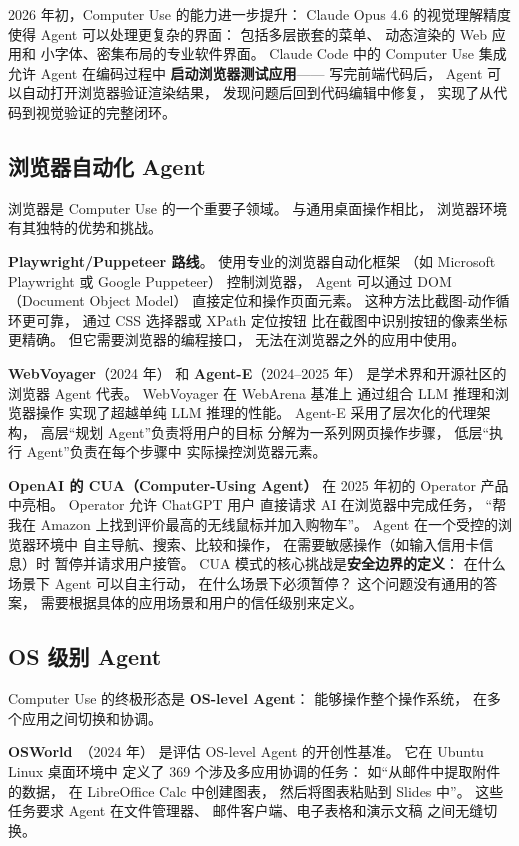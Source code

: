 2026 年初，Computer Use 的能力进一步提升：
Claude Opus 4.6 的视觉理解精度
使得 Agent 可以处理更复杂的界面：
包括多层嵌套的菜单、
动态渲染的 Web 应用和
小字体、密集布局的专业软件界面。
Claude Code 中的 Computer Use 集成
允许 Agent 在编码过程中
\textbf{启动浏览器测试应用}——
写完前端代码后，
Agent 可以自动打开浏览器验证渲染结果，
发现问题后回到代码编辑中修复，
实现了从代码到视觉验证的完整闭环。

\subsection{浏览器自动化 Agent}

浏览器是 Computer Use 的一个重要子领域。
与通用桌面操作相比，
浏览器环境有其独特的优势和挑战。

\textbf{Playwright/Puppeteer 路线}。
使用专业的浏览器自动化框架
（如 Microsoft Playwright 或 Google Puppeteer）
控制浏览器，
Agent 可以通过 DOM（Document Object Model）
直接定位和操作页面元素。
这种方法比截图-动作循环更可靠，
通过 CSS 选择器或 XPath 定位按钮
比在截图中识别按钮的像素坐标更精确。
但它需要浏览器的编程接口，
无法在浏览器之外的应用中使用。

\textbf{WebVoyager}（2024 年）
和 \textbf{Agent-E}（2024--2025 年）
是学术界和开源社区的浏览器 Agent 代表。
WebVoyager 在 WebArena 基准上
通过组合 LLM 推理和浏览器操作
实现了超越单纯 LLM 推理的性能。
Agent-E 采用了层次化的代理架构，
高层“规划 Agent”负责将用户的目标
分解为一系列网页操作步骤，
低层“执行 Agent”负责在每个步骤中
实际操控浏览器元素。

\textbf{OpenAI 的 CUA（Computer-Using Agent）}
在 2025 年初的 Operator 产品中亮相。
Operator 允许 ChatGPT 用户
直接请求 AI 在浏览器中完成任务，
“帮我在 Amazon 上找到评价最高的无线鼠标并加入购物车”。
Agent 在一个受控的浏览器环境中
自主导航、搜索、比较和操作，
在需要敏感操作（如输入信用卡信息）时
暂停并请求用户接管。
CUA 模式的核心挑战是\textbf{安全边界的定义}：
在什么场景下 Agent 可以自主行动，
在什么场景下必须暂停？
这个问题没有通用的答案，
需要根据具体的应用场景和用户的信任级别来定义。

\subsection{OS 级别 Agent}

Computer Use 的终极形态是 \textbf{OS-level Agent}：
能够操作整个操作系统，
在多个应用之间切换和协调。

\textbf{OSWorld}~\cite{xie2024osworld}（2024 年）
是评估 OS-level Agent 的开创性基准。
它在 Ubuntu Linux 桌面环境中
定义了 369 个涉及多应用协调的任务：
如“从邮件中提取附件的数据，
在 LibreOffice Calc 中创建图表，
然后将图表粘贴到 Slides 中”。
这些任务要求 Agent 在文件管理器、
邮件客户端、电子表格和演示文稿
之间无缝切换。

